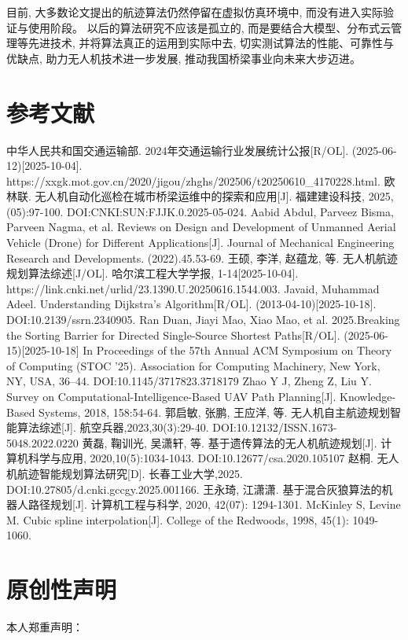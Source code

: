 \documentclass[oneside,UTF8]{ctexart}
\numberwithin{figure}{section} %
\begin{document}
目前,
大多数论文提出的航迹算法仍然停留在虚拟仿真环境中,
而没有进入实际验证与使用阶段。
以后的算法研究不应该是孤立的,
而是要结合大模型、分布式云管理等先进技术,
并将算法真正的运用到实际中去,
切实测试算法的性能、可靠性与优缺点,
助力无人机技术进一步发展,
推动我国桥梁事业向未来大步迈进。
\newpage\section{参考文献}
\vspace{-5em}
\begin{thebibliography}{20}
中华人民共和国交通运输部. 2024年交通运输行业发展统计公报[R/OL]. (2025-06-12)[2025-10-04]. https://xxgk.mot.gov.cn/2020/jigou/zhghs/202506/t20250610\_4170228.html.
欧林联. 无人机自动化巡检在城市桥梁运维中的探索和应用[J]. 福建建设科技, 2025,(05):97-100. DOI:CNKI:SUN:FJJK.0.2025-05-024.
Aabid Abdul, Parveez Bisma, Parveen Nagma, et al. Reviews on Design and Development of Unmanned Aerial Vehicle (Drone) for Different Applications[J]. Journal of Mechanical Engineering Research and Developments. (2022).45.53-69.
王硕, 李洋, 赵蕴龙, 等. 无人机航迹规划算法综述[J/OL]. 哈尔滨工程大学学报, 1-14[2025-10-04]. https://link.cnki.net/urlid/23.1390.U.20250616.1544.003.
Javaid, Muhammad Adeel. Understanding Dijkstra's Algorithm[R/OL]. (2013-04-10)[2025-10-18]. DOI:10.2139/ssrn.2340905.
Ran Duan, Jiayi Mao, Xiao Mao, et al. 2025.Breaking the Sorting Barrier for Directed Single-Source Shortest Paths[R/OL]. (2025-06-15)[2025-10-18] In Proceedings of the 57th Annual ACM Symposium on Theory of Computing (STOC '25). Association for Computing Machinery, New York, NY, USA, 36–44. DOI:10.1145/3717823.3718179
Zhao Y J, Zheng Z, Liu Y. Survey on Computational-Intelligence-Based UAV Path Planning[J]. Knowledge-Based Systems, 2018, 158:54-64.
郭启敏, 张鹏, 王应洋, 等. 无人机自主航迹规划智能算法综述[J]. 航空兵器,2023,30(3):29-40. DOI:10.12132/ISSN.1673-5048.2022.0220 
黄磊, 鞠训光, 吴潇轩, 等. 基于遗传算法的无人机航迹规划[J]. 计算机科学与应用, 2020,10(5):1034-1043. DOI:10.12677/csa.2020.105107
赵桐. 无人机航迹智能规划算法研究[D]. 长春工业大学,2025. DOI:10.27805/d.cnki.gccgy.2025.001166.
王永琦, 江潇潇. 基于混合灰狼算法的机器人路径规划[J]. 计算机工程与科学, 2020, 42(07): 1294-1301.
McKinley S, Levine M. Cubic spline interpolation[J]. College of the Redwoods, 1998, 45(1): 1049-1060.
\end{thebibliography}
\newpage\section{原创性声明}
本人郑重声明：
\end{document}
